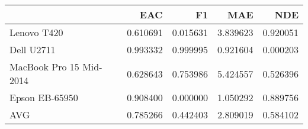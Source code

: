 \begin{tabular}{lrrrr}
\toprule
{} &       EAC &        F1 &       MAE &       NDE \\
\midrule
Lenovo T420             &  0.610691 &  0.015631 &  3.839623 &  0.920051 \\
Dell U2711              &  0.993332 &  0.999995 &  0.921604 &  0.000203 \\
MacBook Pro 15 Mid-2014 &  0.628643 &  0.753986 &  5.424557 &  0.526396 \\
Epson EB-65950          &  0.908400 &  0.000000 &  1.050292 &  0.889756 \\
AVG                     &  0.785266 &  0.442403 &  2.809019 &  0.584102 \\
\bottomrule
\end{tabular}
